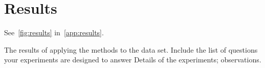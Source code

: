 \section{Results}
See~\autoref{fig:results} in~\autoref{app:results}.

{
\color{red}
The results of applying the methods to the data set. Include the list of questions your experiments are designed to answer Details of the experiments; observations.
}
